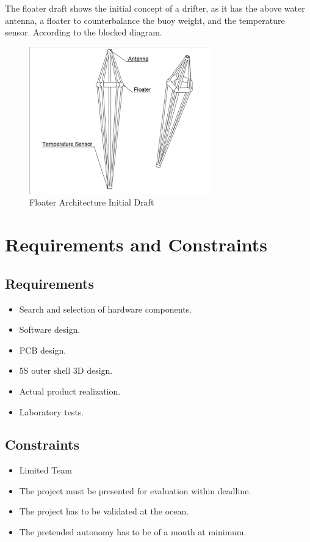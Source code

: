 The floater draft shows the initial concept of a drifter, as it has the above water 
antenna, a floater to counterbalance the buoy weight, and the temperature sensor. 
According to the blocked diagram.
\begin{figure}[H]
    \centering
    \includegraphics[width=0.7\textwidth]{images/diagrams/shell/unnamed.png}  %
    \caption{Floater Architecture Initial Draft}
    \label{fig:Floater Architecture Initial Draft}        
\end{figure}

\section{Requirements and Constraints}
\subsection{Requirements}
\begin{itemize}
    \item Search and selection of hardware components.
    \item Software design.
    \item PCB design.
    \item 5S outer shell 3D design.
    \item Actual product realization.
    \item Laboratory tests.
\end{itemize}
\subsection{Constraints}
\begin{itemize}
    \item Limited Team
    \item The project must be presented for evaluation within deadline.
    \item The project has to be validated at the ocean.
    \item The pretended autonomy has to be of a mouth at minimum.
\end{itemize}

